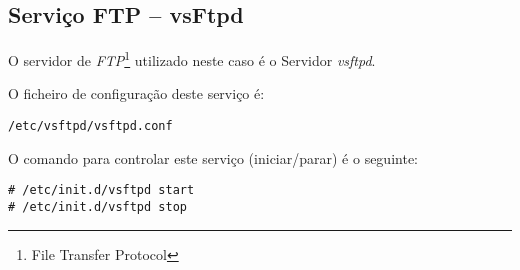 \subsection{Serviço FTP -- vsFtpd}

O servidor de \emph{FTP}\footnote{File Transfer Protocol} utilizado neste caso é o Servidor \emph{vsftpd}.

O ficheiro de configuração deste serviço é:

\begin{Verbatim}[commandchars=\\\{\}]
/etc/vsftpd/vsftpd.conf
\end{Verbatim}

O comando para controlar este serviço (iniciar/parar) é o seguinte:

\begin{Verbatim}[commandchars=\\\{\}]
# /etc/init.d/vsftpd start
# /etc/init.d/vsftpd stop
\end{Verbatim}

